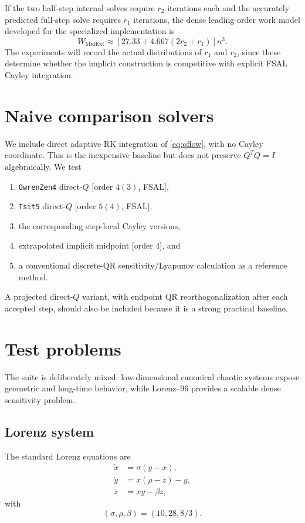 \documentclass[11pt]{article}
\begin{document}
If the two half-step internal solves require $r_2$ iterations each and the accurately predicted full-step solve requires $r_1$ iterations, the dense leading-order work model developed for the specialized implementation is
\begin{equation}
 W_{\mathrm{MidExt}}\approx\left[27.33+4.667(2r_2+r_1)\right]n^3.
 \label{eq:midwork}
\end{equation}
The experiments will record the actual distributions of $r_1$ and $r_2$, since these determine whether the implicit construction is competitive with explicit FSAL Cayley integration.

\section{Naive comparison solvers}
We include direct adaptive RK integration of \eqref{eq:qflow}, with no Cayley coordinate. This is the inexpensive baseline but does not preserve $Q^TQ=I$ algebraically. We test
\begin{enumerate}
 \item \texttt{OwrenZen4} direct-$Q$ [order $4(3)$, FSAL],
 \item \texttt{Tsit5} direct-$Q$ [order $5(4)$, FSAL],
 \item the corresponding step-local Cayley versions,
 \item extrapolated implicit midpoint [order $4$], and
 \item a conventional discrete-QR sensitivity/Lyapunov calculation as a reference method.
\end{enumerate}
A projected direct-$Q$ variant, with endpoint QR reorthogonalization after each accepted step, should also be included because it is a strong practical baseline.

\section{Test problems}
The suite is deliberately mixed: low-dimensional canonical chaotic systems expose geometric and long-time behavior, while Lorenz--96 provides a scalable dense sensitivity problem.

\subsection{Lorenz system}
The standard Lorenz equations \cite{Lorenz1963} are
\begin{align}
 \dot x&=\sigma(y-x),\label{eq:lorenz1}\\
 \dot y&=x(\rho-z)-y,\label{eq:lorenz2}\\
 \dot z&=xy-\beta z,\label{eq:lorenz3}
\end{align}
with
\begin{equation}
 (\sigma,\rho,\beta)=(10,28,8/3).
 \label{eq:lorenzpar}
\end{equation}
\end{document}
